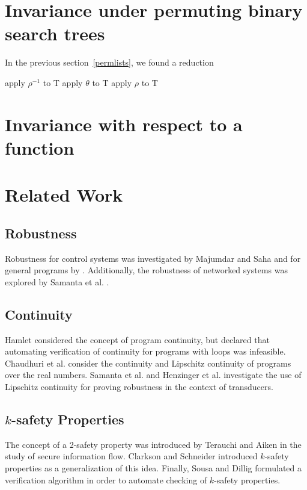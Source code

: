 \documentclass{llncs}
\begin{document}
\section{Invariance under permuting binary search trees}

In the previous section~\ref{permlists}, we found a reduction

\begin{algorithm}
\begin{algorithmic}[1]
  \State apply $\rho^{-1}$ to T
\EndWhile
{}
    \State apply $\theta$ to T
  \EndWhile
  \State apply $\rho$ to T
\EndWhile
\EndFunction
\end{algorithmic}
\end{algorithm}

\section{Invariance with respect to a function}

\section{Related Work}

\subsection{Robustness}

Robustness for control systems was investigated by Majumdar and Saha \cite{majumdar09} and for general programs by \cite{chaudhuri11}.  Additionally, the robustness of networked systems was explored by Samanta et al. \cite{samanta13a}.

\subsection{Continuity}

Hamlet \cite{hamlet02} considered the concept of program continuity, but declared that automating verification of continuity for programs with loops was infeasible.  Chaudhuri et al. \cite{chaudhuri10,chaudhuri11} consider the continuity and Lipschitz continuity of programs over the real numbers. Samanta et al. \cite{samanta13} and Henzinger et al. \cite{samanta14} investigate the use of Lipschitz continuity for proving robustness in the context of transducers.

\subsection{\(k\)-safety Properties}

The concept of a 2-safety property was introduced by Terauchi and Aiken \cite{terauchi05} in the study of secure information flow.  Clarkson and Schneider \cite{clarkson08} introduced \(k\)-safety properties as a generalization of this idea.  Finally, Sousa and Dillig \cite{sousa16} formulated a verification algorithm in order to automate checking of \(k\)-safety properties.

%
%


\end{document}

